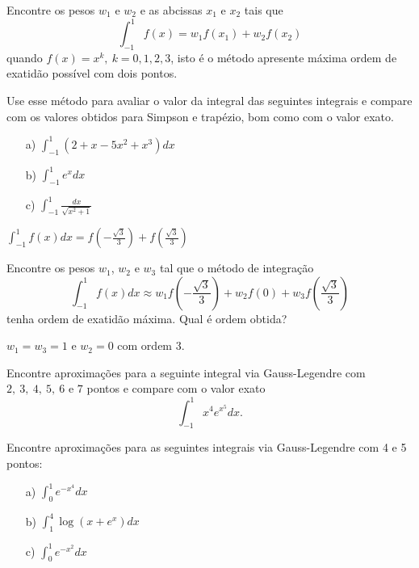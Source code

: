 \begin{Exercise} Encontre os pesos $w_1$ e $w_2$ e as abcissas $x_1$ e $x_2$ tais que
$$\int_{-1}^1f(x)=w_1f(x_1)+w_2f(x_2)$$
quando $f(x)=x^k, ~k=0,1,2,3$, isto é o método apresente máxima ordem de exatidão possível com dois pontos.

Use esse método para avaliar o valor da integral das seguintes integrais e compare com os valores obtidos para Simpson e trapézio, bom como com o valor exato.
\begin{itemize}
\item[a)] $\int_{-1}^1\left(2+x-5x^2+x^3\right)dx$
\item[b)] $\int_{-1}^1e^{x}dx$
\item[c)] $\int_{-1}^1\frac{dx}{\sqrt{x^2+1}}$
\end{itemize}
\end{Exercise}
\begin{Answer}
  \begin{tiny}
$\int_{-1}^1f(x)dx=f\left(-\frac{\sqrt{3}}{3}\right)+f\left(\frac{\sqrt{3}}{3}\right)$    
  \end{tiny}
\end{Answer}


\begin{Exercise} Encontre os pesos $w_1$, $w_2$ e $w_3$ tal que o método de integração
$$\int_{-1}^1 f(x)dx \approx w_1 f\left(-\frac{\sqrt{3}}{3}\right)  + w_2f(0) + w_3f\left(\frac{\sqrt{3}}{3}\right)$$
tenha ordem de exatidão máxima. Qual é ordem obtida?
\end{Exercise}
\begin{Answer}
  \begin{tiny}
$w_1=w_3=1$ e $w_2=0$ com ordem 3.    
  \end{tiny}
\end{Answer}



\begin{Exercise}Encontre aproximações para a seguinte integral via Gauss-Legendre com $2,\ 3,\ 4,\ 5,\ 6$ e $7$ pontos e compare com o valor exato
$$\int_{-1}^1 x^4e^{x^5}dx.$$
\end{Exercise}

\begin{Exercise} Encontre aproximações para as seguintes integrais via Gauss-Legendre com 4 e 5 pontos:
\begin{itemize}
\item[a)] $\int_0^1 e^{-x^4}dx$
\item[b)] $\int_1^4 \log(x+e^x)dx$
\item[c)] $\int_0^1 e^{-x^2}dx$
\end{itemize}
\end{Exercise}

